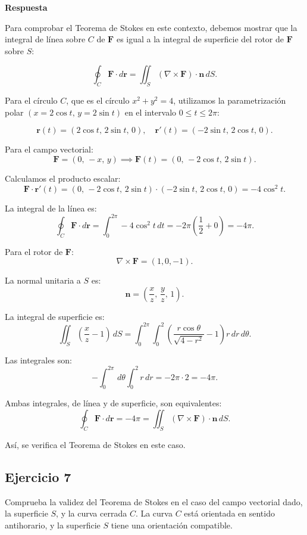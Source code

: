 \documentclass{report}
\begin{document}
\textbf{Respuesta}

Para comprobar el Teorema de Stokes en este contexto, debemos mostrar que la integral de línea sobre \( C \) de \( \mathbf{F} \) es igual a la integral de superficie del rotor de \( \mathbf{F} \) sobre \( S \):

\[
\oint_C \mathbf{F} \cdot d\mathbf{r} = \iint_S (\nabla \times \mathbf{F}) \cdot \mathbf{n} \, dS.
\]



Para el círculo \( C \), que es el círculo \( x^2 + y^2 = 4 \), utilizamos la parametrización polar \( (x = 2\cos t, \, y = 2\sin t) \) en el intervalo \( 0 \leq t \leq 2\pi \):

\[
\mathbf{r}(t) = (2\cos t, \, 2\sin t, \, 0), \quad \mathbf{r}'(t) = (-2\sin t, \, 2\cos t, \, 0).
\]

Para el campo vectorial:
\[
\mathbf{F} = (0, \, -x, \, y) \implies \mathbf{F}(t) = (0, \, -2\cos t, \, 2\sin t).
\]

Calculamos el producto escalar:
\[
\mathbf{F} \cdot \mathbf{r}'(t) = (0, \, -2\cos t, \, 2\sin t) \cdot (-2\sin t, \, 2\cos t, \, 0) = -4\cos^2 t.
\]

La integral de la línea es:
\[
\oint_C \mathbf{F} \cdot d\mathbf{r} = \int_0^{2\pi} -4\cos^2 t \, dt = -2\pi \left(\frac{1}{2} + 0\right) = -4\pi.
\]



Para el rotor de \( \mathbf{F} \):
\[
\nabla \times \mathbf{F} = (1, 0, -1).
\]

La normal unitaria a \( S \) es:
\[
\mathbf{n} = \left(\frac{x}{z}, \, \frac{y}{z}, \, 1\right).
\]

La integral de superficie es:
\[
\iint_S \left(\frac{x}{z} - 1\right) \, dS = \int_0^{2\pi} \int_0^2 \left(\frac{r\cos\theta}{\sqrt{4 - r^2}} - 1\right) r \, dr \, d\theta.
\]

Las integrales son:
\[
-\int_0^{2\pi} \, d\theta \int_0^2 r \, dr = -2\pi \cdot 2 = -4\pi.
\]

Ambas integrales, de línea y de superficie, son equivalentes:
\[
\oint_C \mathbf{F} \cdot d\mathbf{r} = -4\pi = \iint_S (\nabla \times \mathbf{F}) \cdot \mathbf{n} \, dS.
\]

Así, se verifica el Teorema de Stokes en este caso.

\subsection*{Ejercicio 7}
Comprueba la validez del Teorema de Stokes en el caso del campo vectorial dado, la superficie \( S \), y la curva cerrada \( C \). La curva \( C \) está orientada en sentido antihorario, y la superficie \( S \) tiene una orientación compatible.
\end{document}
